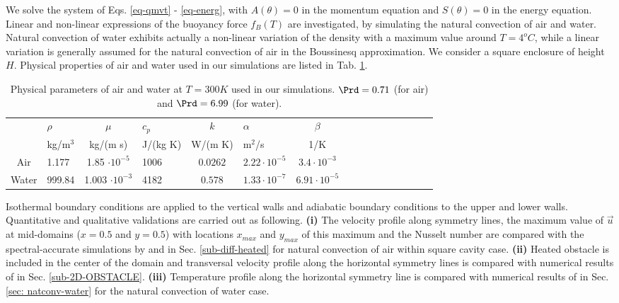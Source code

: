 We solve the system of Eqs. \ref{eq-qmvt} - \ref{eq-energ}, with $A(\theta) = 0$ in the momentum equation and $S(\theta) = 0$ in the energy equation.
Linear and non-linear expressions of the buoyancy force $f_B(T)$ are investigated, by simulating the natural convection of air and water.
Natural convection of water exhibits actually a non-linear variation of the density with a maximum value around $T=4^o C$, while a linear variation is generally assumed for the natural convection of air in the Boussinesq approximation.
We consider a square enclosure of height $H$. 
Physical properties of air and water used in our simulations are listed in Tab. \ref{tab-param-phys-air}.
\begin{table}[!ht]
   \begin{center}
      \begin{tabular}{*{8}{cl}}
         
        & $\rho$ &$ \mu$ & $c_p $ & $k$ & $\alpha $ & $\beta$ \\
        & kg/m$^3$& kg/(m s) & J/(kg K) & W/(m K) & m$^2$/s & 1/K \\
         \hline
        Air & 1.177 & 1.85 $\cdot 10^{-5}$  & 1006 & $0.0262$ & $2.22 \cdot 10^{-5}$ & $3.4 \cdot 10^{-3}$ \\
        Water & 999.84 & 1.003 $\cdot 10^{-3}$  & 4182 & $0.578$ & $1.33 \cdot 10^{-7}$ & $6.91 \cdot 10^{-5}$
      \end{tabular}
   \end{center}
   \caption{Physical parameters of air and water at $T = 300K$ used in our simulations. $\Prd = 0.71$ (for air) and $\Prd = 6.99$ (for water).}
   \label{tab-param-phys-air}
\end{table}

\noindent Isothermal boundary conditions are applied to the vertical walls and adiabatic boundary conditions to the upper and lower walls.
Quantitative and qualitative validations are carried out as following.
\textbf{(i)} The velocity profile along symmetry lines, the maximum value of $\vec u$ at mid-domains ($x=0.5$ and $y=0.5$) with locations $x_{max}$ and $y_{max}$ of this maximum and the Nusselt number are compared with the spectral-accurate simulations by \cite{LeQuere91} and  \cite{de1983natural} in Sec. \ref{sub-diff-heated} for natural convection of air within square cavity case.
\textbf{(ii)} Heated obstacle is included in the center of the domain and transversal velocity profile along the  horizontal symmetry lines is compared with numerical results of \cite{Raluca2013} 
in Sec. \ref{sub-2D-OBSTACLE}.
\textbf{(iii)} Temperature profile along the horizontal symmetry line is compared with numerical results of \cite{Kowalewski-2003} in Sec. \ref{sec: natconv-water} for the natural convection of water case.


